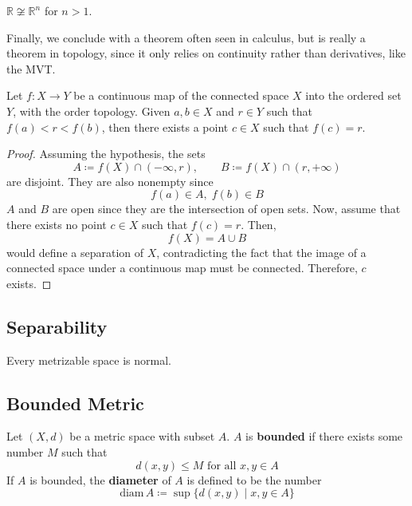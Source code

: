   \begin{corollary}
    $\mathbb{R} \not\cong \mathbb{R}^n$ for $n > 1$. 
  \end{corollary}

  Finally, we conclude with a theorem often seen in calculus, but is really a theorem in topology, since it only relies on continuity rather than derivatives, like the MVT. 

  \begin{theorem}
    Let $f: X \longrightarrow Y$ be a continuous map of the connected space $X$ into the ordered set $Y$, with the order topology. Given $a, b \in X$ and $r \in Y$ such that $f(a)<r<f(b)$, then there exists a point $c \in X$ such that $f(c) = r$. 
  \end{theorem}
  \begin{proof}
    Assuming the hypothesis, the sets 
    \begin{equation}
      A \coloneqq f(X) \cap (-\infty, r), \qquad B \coloneqq f(X) \cap (r, +\infty)
    \end{equation}
    are disjoint. They are also nonempty since 
    \begin{equation}
      f(a) \in A, \; f(b) \in B
    \end{equation}
    $A$ and $B$ are open since they are the intersection of open sets. Now, assume that there exists no point $c \in X$ such that $f(c) = r$. Then, 
    \begin{equation}
      f(X) = A \cup B
    \end{equation}
    would define a separation of $X$, contradicting the fact that the image of a connected space under a continuous map must be connected. Therefore, $c$ exists. 
  \end{proof}  

\subsection{Separability} 

  \begin{theorem}
    Every metrizable space is normal. 
  \end{theorem}

\subsection{Bounded Metric}

  \begin{definition}
    Let $(X, d)$ be a metric space with subset $A$. $A$ is \textbf{bounded} if there exists some number $M$ such that
    \begin{equation}
      d (x, y) \leq M \text{ for all } x,y \in A
    \end{equation}
    If $A$ is bounded, the \textbf{diameter} of $A$ is defined to be the number
    \begin{equation}
      \text{diam}\, A \coloneqq \sup{\{d(x, y) \mid x, y \in A\}}
    \end{equation}
  \end{definition}

